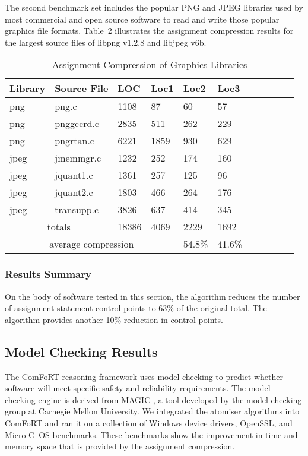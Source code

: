 The second benchmark set includes the popular PNG and JPEG libraries
used by most commercial and open source software to read and write
those popular graphics file formats.  Table~2 illustrates
the assignment compression results for the largest source files of
libpng v1.2.8 and libjpeg v6b.

\begin{table}
\begin{center}
\begin{tabular}{|l|l|l|l|l|l|l|l|l|l|l|} \hline
Library & Source File & LOC & Loc1 & Loc2 & Loc3 \\ \hline
png & png.c & 1108 & 87 & 60 & 57 \\ \hline
png & pnggccrd.c & 2835 & 511 & 262 & 229 \\ \hline
png & pngrtan.c & 6221 & 1859 & 930 & 629 \\ \hline
jpeg & jmemmgr.c & 1232 & 252 & 174 & 160 \\ \hline
jpeg & jquant1.c & 1361 & 257 & 125 & 96 \\ \hline
jpeg & jquant2.c & 1803 & 466 & 264 & 176 \\ \hline
jpeg & transupp.c & 3826 & 637 & 414 & 345 \\ \hline
\multicolumn{2}{|c|}{totals} & 18386 & 4069 & 2229 & 1692 \\ \hline
\multicolumn{4}{|c|}{average compression} & 54.8\% & 41.6\% \\ \hline
\end{tabular}
\end{center}
\label{graphics}
\caption{Assignment Compression of Graphics Libraries}
\end{table}

\subsubsection{Results Summary}

On the body of software tested in this section, the \atomizer{}
algorithm reduces the number of assignment statement control points to
63\% of the original total.  The \catomizer{} algorithm
provides another 10\% reduction in control points. 

\subsection{Model Checking Results}

The ComFoRT reasoning framework \cite{comfort} uses model checking to
predict whether software will meet specific safety and reliability
requirements.  The model checking engine is derived from MAGIC
\cite{sagar:efficientverification}, a tool developed by the model
checking group at Carnegie Mellon University. We integrated the
atomiser algorithms into ComFoRT and ran it on a collection of Windows
device drivers, OpenSSL, and Micro-C~OS benchmarks.  These benchmarks
show the improvement in time and memory space that is provided by the
assignment compression.

